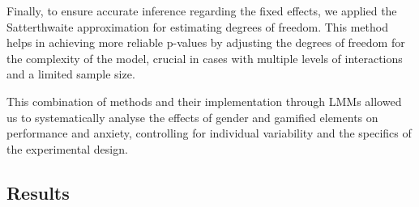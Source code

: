 Finally, to ensure accurate inference regarding the fixed effects, we applied the Satterthwaite approximation for estimating degrees of freedom.
This method helps in achieving more reliable p-values by adjusting the degrees of freedom for the complexity of the model, crucial in cases with multiple levels of interactions and a limited sample size.

This combination of methods and their implementation through LMMs allowed us to systematically analyse the effects of gender and gamified elements on performance and anxiety, controlling for individual variability and the specifics of the experimental design.

\subsection{Results}

